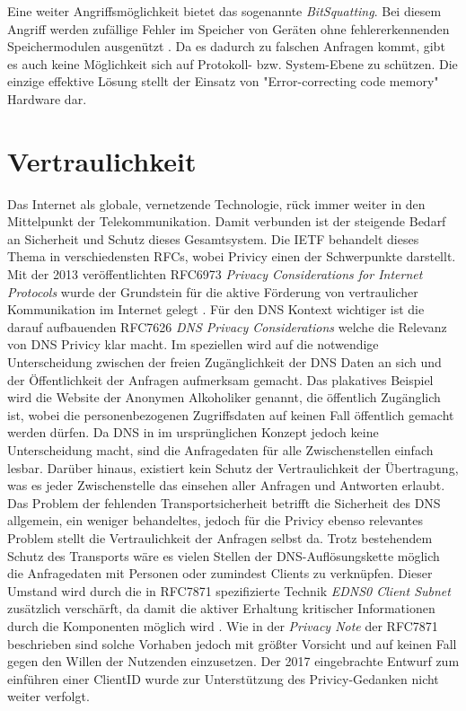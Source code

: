 Eine weiter Angriffsmöglichkeit bietet das sogenannte \textit{BitSquatting}. Bei diesem Angriff werden zufällige Fehler im Speicher von Geräten ohne fehlererkennenden Speichermodulen ausgenützt \cite{Dinaburg2011}. Da es dadurch zu falschen Anfragen kommt, gibt es auch keine Möglichkeit sich auf Protokoll- bzw. System-Ebene zu schützen. Die einzige effektive Lösung stellt der Einsatz von "Error-correcting code memory" Hardware dar.  

\section{Vertraulichkeit}
\label{sec:Thread-Priv}

Das Internet als globale, vernetzende Technologie, rück immer weiter in den Mittelpunkt der Telekommunikation. Damit verbunden ist der steigende Bedarf an Sicherheit und Schutz dieses Gesamtsystem. Die IETF behandelt dieses Thema in verschiedensten RFCs, wobei Privicy einen der Schwerpunkte darstellt. Mit der 2013 veröffentlichten RFC6973 \textit{Privacy Considerations for Internet Protocols} wurde der Grundstein für die aktive Förderung von vertraulicher Kommunikation im Internet gelegt \cite{Cooper2013}. 
Für den DNS Kontext wichtiger ist die darauf aufbauenden RFC7626 \textit{DNS Privacy Considerations}\cite{Bortzmeyer2015} welche die Relevanz von DNS Privicy klar macht. Im speziellen wird auf die notwendige Unterscheidung zwischen der freien Zugänglichkeit der DNS Daten an sich und der Öffentlichkeit der Anfragen aufmerksam gemacht. Das plakatives Beispiel wird die Website der Anonymen Alkoholiker genannt, die öffentlich Zugänglich ist, wobei die personenbezogenen Zugriffsdaten auf keinen Fall öffentlich gemacht werden dürfen. Da DNS in im ursprünglichen Konzept jedoch keine Unterscheidung macht, sind die Anfragedaten für alle Zwischenstellen einfach lesbar. Darüber hinaus, existiert kein Schutz der Vertraulichkeit der Übertragung, was es jeder Zwischenstelle das einsehen aller Anfragen und Antworten erlaubt.
Das Problem der fehlenden Transportsicherheit betrifft die Sicherheit des DNS allgemein, ein weniger behandeltes, jedoch für die Privicy ebenso relevantes Problem stellt die Vertraulichkeit der Anfragen selbst da. Trotz bestehendem Schutz des Transports wäre es vielen Stellen der DNS-Auflösungskette möglich die Anfragedaten mit Personen oder zumindest Clients zu verknüpfen. Dieser Umstand wird durch die in RFC7871 spezifizierte Technik \textit{EDNS0 Client Subnet} zusätzlich verschärft, da damit die aktiver Erhaltung kritischer Informationen durch die Komponenten möglich wird \cite{Contavalli2016}. Wie in der \textit{Privacy Note} der RFC7871 beschrieben sind solche Vorhaben jedoch mit größter Vorsicht und auf keinen Fall gegen den Willen der Nutzenden einzusetzen. Der 2017 eingebrachte Entwurf zum einführen einer ClientID\cite{Licht2017} wurde zur Unterstützung des Privicy-Gedanken nicht weiter verfolgt.

